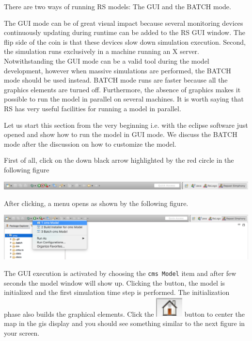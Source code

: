 \documentclass{article}
\begin{document}
There are two ways of running RS models: The GUI and the BATCH mode.

The GUI mode can be of great visual impact because several monitoring devices continuously updating during runtime can be added to the RS GUI window. The flip side of the coin is that these devices slow down simulation execution. Second, the simulation runs exclusively in a machine running an X server. Notwithstanding the GUI mode can be a valid tool during the model development, however when massive simulations are performed, the BATCH mode should be used instead. BATCH mode runs are faster because all the graphics elements are turned off. Furthermore, the absence of graphics makes it possible to run the model in parallel on several machines. It is worth saying that RS has very useful facilities for running a model in parallel.


Let us start this section from the very beginning i.e. with the eclipse software just opened and show how to run the model in GUI mode. 
We discuss the BATCH mode after the discussion on how to customize the model.

First of all, click on the down black arrow highlighted by the red circle in the following figure

\vskip2mm
\noindent
\includegraphics[scale=0.35]{fig_cms_rs_execution1}

After clicking, a menu opens as shown by the following figure. 

\vskip2mm
\noindent
\includegraphics[scale=0.35]{fig_cms_rs_execution2}

\vskip2mm
The GUI execution is activated by choosing the \verb+cms Model+ item and after few seconds the model window will show up. Clicking the  button, the model is initialized and the first simulation time step is performed. The initialization phase also builds the graphical elements. Click the \includegraphics[scale=0.4]{fig_home} button to center the map in the gis display and you should see something similar to the next figure in your screen.
\end{document}
